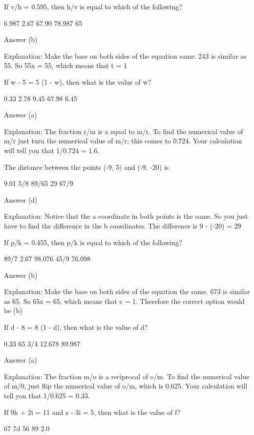    If v/h = 0.595, then h/v is equal to which of the following?

        6.987
        2.67
        67.90
        78.987
        65 

    Answer (b)

    Explanation: Make the base on both sides of the equation  same. 243 is similar as 55. So 55x  = 55, which means that t = 1

    If w - 5 = 5 (1 - w), then what is the value of w?

        0.33
        2.78
        9.45
        67.98
        6.45 

    Answer (a)

    Explanation: The fraction r/m is a equal to m/r. To find the numerical value of m/r just turn the numerical value of m/r; this comes to 0.724. Your calculation will tell you that 1/0.724 = 1.6.

    The distance between the points (-9, 5) and (-9, -20) is

        9.01
        5/8
        89/65
        29
        67/9 

    Answer (d)

    Explanation: Notice that the a coordinate in both points is the same. So you just have to find the difference in the b coordinates. The difference is 9 - (-20) = 29

    If p/k = 0.455, then p/k is equal to which of the following?

        89/7
        2.67
        98.076
        45/9
        76.098 

    Answer (b)

    Explanation: Make the base on both sides of the equation the same. 673 is similar as 65. So 65x  = 65, which means that c = 1. Therefore the correct option would be (b)

    If d - 8 = 8 (1 - d), then what is the value of d?

        0.33
        65
        3/4
        12.678
        89.987 

    Answer (a)

    Explanation: The fraction m/o is a reciprocal of o/m. To find the numerical value of m/0, just flip the numerical value of o/m, which is 0.625. Your calculation will tell you that 1/0.625 = 0.33.

    If 9h + 2i = 11 and z - 3i = 5, then what is the value of f?

        67
        7d
        56
        89
        2.0 

